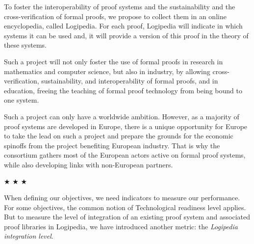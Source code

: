 To foster the interoperability of proof systems and the sustainability
and the cross-verification of formal proofs, we propose to collect
them in an online encyclopedia, called Logipedia.  For each proof,
Logipedia will indicate in which systems it can be used and, it will
provide a version of this proof in the theory of these systems.

Such a project will not only foster the use of formal proofs in
research in mathematics and computer science, but also in industry, by
allowing cross-verification, sustainability, and interoperability of
formal proofs, and in education, freeing the teaching of formal proof
technology from being bound to one system.

Such a project can only have a worldwide ambition. However, as a
majority of proof systems are developed in Europe, there is a unique
opportunity for Europe to take the lead on such a project and prepare
the grounds for the economic spinoffs from the project benefiting
European industry. That is why the consortium gathers most of the
European actors active on formal proof systems, while also developing
links with non-European partners.

\begin{center}
  
$\bigstar$ $\bigstar$ $\bigstar$

\end{center}

When defining our objectives, we need indicators to measure our
performance. For some objectives, the common notion of Technological
readiness level applies. But to measure the level of integration of an
existing proof system and associated proof libraries in Logipedia, we
have introduced another metric: the {\em Logipedia integration
  level}.

